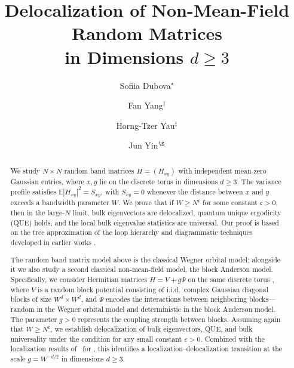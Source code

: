\documentclass[reqno]{amsart}
\title{Delocalization of Non-Mean-Field Random Matrices \\ in Dimensions $d\ge 3$}
\author{Sofiia Dubova$^\star$}
\author{Fan Yang$^\dagger$}
\author{Horng-Tzer Yau$^\ddagger$}
\author{Jun Yin$^\S$}
\newcommand{\ilambda}{g}
\theoremstyle{plain} %
\theoremstyle{remark}
\numberwithin{equation}{section}
\begin{document}
 



\begin{abstract}

\small 
We study $N \times N$ random band matrices $H = (H_{xy})$ with independent mean-zero Gaussian entries, where $x,y$ lie on the discrete torus  in dimensions $d \ge 3$. The variance profile satisfies $\mathbb{E}|H_{xy}|^2 = S_{xy}$, with $S_{xy} = 0$ whenever the distance between $x$ and $y$ exceeds a bandwidth parameter $W$. We prove that if $W \geq N^{\mathfrak{c}}$ for some constant $\mathfrak{c} > 0$, then in the large-$N$ limit, bulk eigenvectors are delocalized, quantum unique ergodicity (QUE) holds, and the local bulk eigenvalue statistics are universal. Our proof is based on the tree approximation of the loop hierarchy \cite{YY_25} and diagrammatic techniques developed in earlier works \cite{yang2021random, yang2021delocalization, yang2022delocalization, DY, DYYY25}.


The random band matrix model above is the classical Wegner orbital model; alongside it we also study a second classical non-mean-field model, the block Anderson model. Specifically, we consider Hermitian matrices $H = V + \ilambda \Psi$ on the same discrete torus ,  
where $V$ is a random block potential consisting of i.i.d.~complex Gaussian diagonal blocks of size $W^d \times W^d$, and $\Psi$ encodes the interactions between neighboring blocks---random in the Wegner orbital model and deterministic in the block Anderson model. 
The parameter $\ilambda > 0$ represents the coupling strength between blocks. Assuming again that $W \geq N^{\mathfrak{c}}$, we establish delocalization of bulk eigenvectors, QUE, and bulk universality under the condition \smash{$W^{-d/2+\varepsilon}\le \ilambda \le \varepsilon^{-1}$} for any small constant $\varepsilon>0$. 
Combined with the localization results of~\cite{PelSchShaSod} for \smash{$\ilambda \ll W^{-d/2}$}, this identifies a localization--delocalization transition at the scale $\ilambda=W^{-d/2}$ in dimensions $d \ge 3$.
\end{abstract}

\maketitle
 
{
\hypersetup{linkcolor=black}
\tableofcontents
}

 















\end{document}
